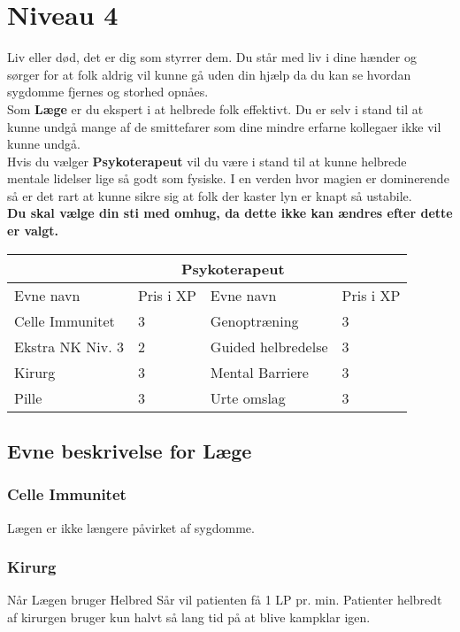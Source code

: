 \chapter{Niveau 4}
Liv eller død, det er dig som styrrer dem. Du står med liv i dine hænder og sørger for at folk aldrig vil kunne gå uden din hjælp da du kan se hvordan sygdomme fjernes og storhed opnåes.\\
Som \textbf{Læge} er du ekspert i at helbrede folk effektivt. Du er selv i stand til at kunne undgå mange af de smittefarer som dine mindre erfarne kollegaer ikke vil kunne undgå.\\ 
Hvis du vælger \textbf{Psykoterapeut} vil du være i stand til at kunne helbrede mentale lidelser lige så godt som fysiske. I en verden hvor magien er dominerende så er det rart at kunne sikre sig at folk der kaster lyn er knapt så ustabile.\\

\textbf{Du skal vælge din sti med omhug, da dette ikke kan ændres efter dette er valgt.}\\

\begin{tabular}{|p{}|p{}|p{}|p{}|}
\hline
\rowcolor{cerulean!80}
 \multicolumn{2}{|c|}{ Læge } & \multicolumn{2}{|c|}{ Psykoterapeut }\\
\hline
\rowcolor{cerulean!40}
    Evne navn & Pris i XP & Evne navn & Pris i XP\\ \hline
    Celle Immunitet & 3 & Genoptræning & 3 \\\hline
    Ekstra NK Niv. 3 & 2 &Guided helbredelse& 3 \\\hline
    Kirurg & 3 & Mental Barriere & 3\\\hline
    Pille & 3 & Urte omslag & 3\\\hline 
\end{tabular}

\section{Evne beskrivelse for Læge}

\subsection{Celle Immunitet}
Lægen er ikke længere påvirket af sygdomme.



\subsection{Kirurg}
Når Lægen bruger Helbred Sår vil patienten få 1 LP pr. min. Patienter helbredt af kirurgen bruger kun halvt så lang tid på at blive kampklar igen.

